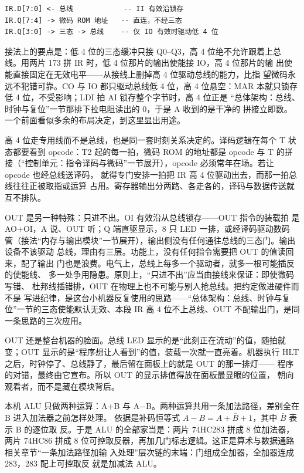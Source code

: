 \begin{lstlisting}
IR.D[7:0] <- 总线            -- II 有效沿锁存
IR.Q[7:4] -> 微码 ROM 地址   -- 直连，不经三态
IR.Q[3:0] -> 三态 -> 总线    -- 仅 IO 有效时驱动低 4 位
\end{lstlisting}

接法上的要点是：低 4 位的三态缓冲只接 Q0--Q3，高 4 位绝不允许跟着上总
线。用两片 173 拼 IR 时，低 4 位那片的输出使能接 IO，高 4 位那片的输
出使能直接固定在无效电平——从接线上删掉高 4 位驱动总线的能力，比指
望微码永远不犯错可靠。CO 与 IO 都只驱动总线低 4 位，高 4 位悬空：MAR
本就只锁存低 4 位，不受影响；LDI 拍 AI 锁存整个字节时，高 4 位正是
“总体架构：总线、时钟与复位”一节那排下拉电阻读出的 0，于是 A 收到的是干净的  拼接立即数。
一个前面看似多余的布局决定，到这里显出用途。

高 4 位走专用线而不是总线，也是同一套时刻关系决定的。译码逻辑在每个
T 状态都要看到 opcode：T2 起的每一拍，微码 ROM 的地址都是 opcode 与 T
的拼接（“控制单元：指令译码与微码”一节展开），opcode 必须常年在场。若让 opcode 也经总线送译码，
就得专门安排一拍把 IR 高 4 位驱动出去，而那一拍总线往往正被取指或运算
占用。寄存器输出分两路、各走各的，译码与数据传送就互不排队。

OUT 是另一种特殊：只进不出。OI 有效沿从总线锁存——OUT 指令的装载拍
是 AO+OI，A 说、OUT 听；Q 端直驱显示，8 只 LED 一排，或经译码驱动数码
管（接法“内存与输出模块”一节展开），输出侧没有任何通往总线的三态门。输出设备不该驱动
总线，理由有三层。功能上，没有任何指令需要把 OUT 的值读回来，配了输出
门也是浪费。电气上，总线上每多一个驱动者，就多一根可能插反的使能线、
多一处争用隐患。原则上，“只进不出”应当由接线来保证：即使微码写错、
杜邦线插错排，OUT 在物理上也不可能与别人抢总线。把约定做进硬件而不是
写进纪律，是这台小机器反复使用的思路——“总体架构：总线、时钟与复位”一节的三态使能默认无效、本段
IR 高 4 位不上总线、OUT 不配输出门，是同一条思路的三次应用。

OUT 还是整台机器的脸面。总线 LED 显示的是“此刻正在流动”的值，随拍就
变；OUT 显示的是“程序想让人看到”的值，装载一次就一直亮着。机器执行
HLT 之后，时钟停了、总线静了，最后留在面板上的就是 OUT 的那一排灯——
程序的对错，最终由它宣布。所以 OUT 的显示排值得放在面板最显眼的位置，
朝向观看者，而不是藏在模块背后。

本机 ALU 只做两种运算：A+B 与
A$-$B。两种运算共用一条加法路径，差别全在 B 进入加法器之前怎样处理。
依据是补码恒等式 $A-B = A+\bar{B}+1$，其中 $\bar{B}$ 表示 B 的逐位取
反。于是 ALU 的全部家当是：两片 74HC283 拼成 8 位加法器，两片 74HC86
拼成 8 位可控取反器，再加几门标志逻辑。这正是算术与数据通路相关章节“一条加法路径加输
入处理”层次链的末端：门组成全加器，全加器连成 283，283 配上可控取反
就是加减法 ALU。

